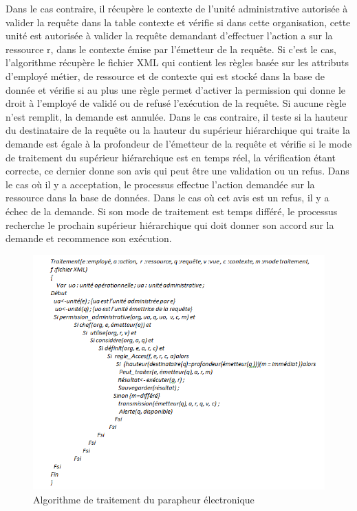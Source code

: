 \hspace*{0.5cm} Dans le cas contraire, il récupère le contexte de l'unité administrative autorisée à valider la requête dans la table contexte et vérifie si dans cette organisation, cette unité est autorisée à valider la requête demandant d'effectuer l'action a sur la ressource r, dans le contexte émise par l'émetteur de la requête. Si c'est le cas, l'algorithme récupère le fichier XML qui contient les règles basée sur les attributs d'employé métier, de ressource et de contexte qui est stocké dans la base de donnée et vérifie si au plus une règle permet d'activer la permission qui donne le droit à l'employé de validé ou de refusé l'exécution de la requête. Si aucune règle n'est remplit, la demande est annulée. Dans le cas contraire, il teste si la hauteur du destinataire de la requête ou la hauteur du supérieur hiérarchique qui traite la demande est égale à la profondeur de l'émetteur de la requête et vérifie si le mode de traitement du supérieur hiérarchique est en temps réel, la vérification étant correcte, ce dernier donne son avis qui peut être une validation ou un refus. Dans le cas où il y a acceptation, le processus effectue l'action demandée sur la ressource dans la base de données. Dans le cas où cet avis est un refus, il y a échec de la demande. Si son mode de traitement est temps différé, le processus recherche le prochain supérieur hiérarchique qui doit donner son accord sur la demande et recommence son exécution.

\begin{figure}[h!]
    \centering
		\includegraphics[scale=0.7]{chap3/images/traitement.png}
    \caption{Algorithme de traitement du parapheur électronique}
	 \label{figtraitement}
\end{figure} 

